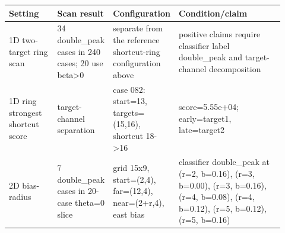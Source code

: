 \begin{tabular}{p{0.18\linewidth}p{0.16\linewidth}p{0.18\linewidth}p{0.40\linewidth}}
\toprule
Setting & Scan result & Configuration & Condition/claim \\
\midrule
1D two-target ring scan & 34 double\_peak cases in 240 cases; 20 use beta>0 & separate from the reference shortcut-ring configuration above & positive claims require classifier label double\_peak and target-channel decomposition \\
1D ring strongest shortcut score & target-channel separation & case 082: start=13, targets=(15,16), shortcut 18->16 & score=5.55e+04; early=target1, late=target2 \\
2D bias-radius & 7 double\_peak cases in 20-case theta=0 slice & grid 15x9, start=(2,4), far=(12,4), near=(2+r,4), east bias & classifier double\_peak at (r=2, b=0.16), (r=3, b=0.00), (r=3, b=0.16), (r=4, b=0.08), (r=4, b=0.12), (r=5, b=0.12), (r=5, b=0.16) \\
\bottomrule
\end{tabular}
